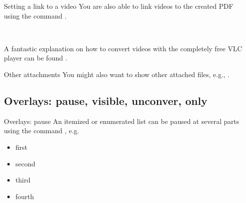 \documentclass{beamer}
\begin{document}
\begin{frame}{Setting a link to a video}
You are also able to link videos to the created PDF using the command .
\begin{center}
	\qquad
	 \\[0.3cm]
	\qquad
\end{center}
A fantastic explanation on how to convert videos with the completely free VLC player can be found .
\end{frame}


\begin{frame}{Other attachments}
You might also want to show other attached files, e.g., .
\end{frame}


\subsection{Overlays: pause, visible, unconver, only}
\begin{frame}{Overlays: pause}
An itemized or enumerated list can be paused at several parts using the command , e.g.
\begin{itemize}
	\pause
	\item first
	\pause
	\item second
	\pause
	\item third
	\item fourth
\end{itemize}
\end{frame}
\end{document}
